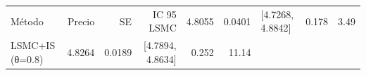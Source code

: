 \begin{tabular}{p{3.3cm}rrrrr}
\toprule
Método & Precio & SE & IC 95%
\midrule
LSMC & 4.8055 & 0.0401 & [4.7268, 4.8842] & 0.178 & 3.49 \\
LSMC+IS (θ=0.8) & 4.8264 & 0.0189 & [4.7894, 4.8634] & 0.252 & 11.14 \\
\bottomrule
\end{tabular}
